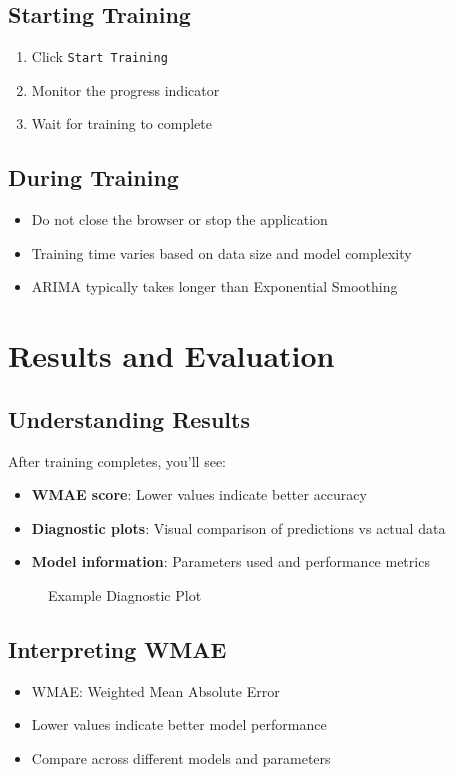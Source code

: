 \subsection{Starting Training}
\begin{enumerate}
	\item Click \texttt{Start Training}
	\item Monitor the progress indicator
	\item Wait for training to complete
\end{enumerate}

\subsection{During Training}
\begin{itemize}
	\item Do not close the browser or stop the application
	\item Training time varies based on data size and model complexity
	\item ARIMA typically takes longer than Exponential Smoothing
\end{itemize}

\section{Results and Evaluation}

\subsection{Understanding Results}
After training completes, you'll see:
\begin{itemize}
	\item \textbf{WMAE score}: Lower values indicate better accuracy
	\item \textbf{Diagnostic plots}: Visual comparison of predictions vs actual data
	\item \textbf{Model information}: Parameters used and performance metrics
\end{itemize}

\begin{figure}[h]
	\centering
	\caption{Example Diagnostic Plot}
\end{figure}

\subsection{Interpreting WMAE}
\begin{itemize}
	\item WMAE: Weighted Mean Absolute Error
	\item Lower values indicate better model performance
	\item Compare across different models and parameters
\end{itemize}

